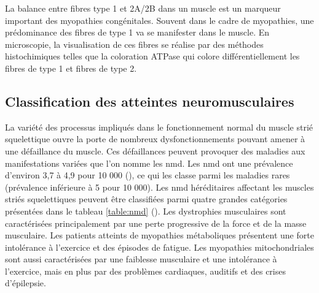 La balance entre fibres type 1 et 2A/2B dans un muscle est un marqueur important des myopathies congénitales. Souvent dans le cadre de myopathies, une prédominance des fibres de type 1 va se manifester dans le muscle. En microscopie, la visualisation de ces fibres se réalise par des méthodes histochimiques telles que la coloration ATPase qui colore différentiellement les fibres de type 1 et fibres de type 2. 

\subsection{Classification des atteintes neuromusculaires}
La variété des processus impliqués dans le fonctionnement normal du muscle strié squelettique ouvre la porte de nombreux dysfonctionnements pouvant amener à une défaillance du muscle. Ces défaillances peuvent provoquer des maladies aux manifestations variées que l'on nomme les \gls{nmd}. Les \gls{nmd} ont une prévalence d'environ 3,7 à 4,9 pour 10 000 (\cite{lace_overview_2022}), ce qui les classe parmi les maladies rares (prévalence inférieure à 5 pour 10 000).  Les \gls{nmd} héréditaires affectant les muscles striés squelettiques peuvent être classifiées parmi quatre grandes catégories présentées dans le tableau \ref{table:nmd} (\cite{lornage_identification_2019, benarroch_2023_2023}). Les dystrophies musculaires sont caractérisées principalement par une perte progressive de la force et de la masse musculaire. Les patients atteints de myopathies métaboliques présentent une forte intolérance à l'exercice et des épisodes de fatigue. Les myopathies mitochondriales sont aussi caractérisées par une faiblesse musculaire et une intolérance à l'exercice, mais en plus par des problèmes cardiaques, auditifs et des crises d'épilepsie.

